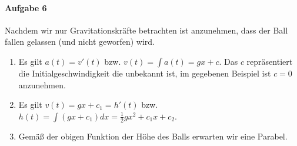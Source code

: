\documentclass{article}
\begin{document}
\paragraph{Aufgabe 6}

Nachdem wir nur Gravitationskräfte betrachten ist anzunehmen, dass der Ball fallen gelassen (und nicht geworfen) wird.

\begin{enumerate}
    \item Es gilt $a(t) = v'(t)$ bzw. $v(t) = \int a(t) = gx + c$. Das $c$ repräsentiert die Initialgeschwindigkeit die unbekannt ist, im gegebenen Beispiel ist $c = 0$ anzunehmen.
    
    \item Es gilt $v(t) = gx + c_1 = h'(t)$ bzw. $h(t) = \int(gx + c_1)dx = \frac{1}{2}gx^2 + c_1x + c_2$.
    
    \item Gemäß der obigen Funktion der Höhe des Balls erwarten wir eine Parabel.
\end{enumerate}
\end{document}
